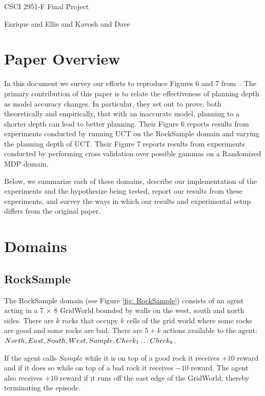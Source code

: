 \documentclass[11pt,twocolumn]{article}
\begin{document}
\centerline{\LARGE{CSCI 2951-F Final Project}}
\centerline{Enrique and Ellis and Kavosh and Dave}
\vspace{2mm}


\section{Paper Overview}

In this document we survey our efforts to reproduce Figures 6 and 7 from~\cite{jiang2015dependence}. The primary contribution of this paper is to relate the effectiveness of planning depth as model accuracy changes. In particular, they set out to prove, both theoretically and empirically, that with an inaccurate model, planning to a shorter depth can lead to better planning. Their Figure 6 reports results from experiments conducted by running UCT on the RockSample domain and varying the planning depth of UCT. Their Figure 7 reports results from experiments conducted by performing cross validation over possible gammas on a Randomized MDP domain.

Below, we summarize each of these domains, describe our implementation of the experiments and the hypothesize being tested, report our results from these experiments, and survey the ways in which our results and experimental setup differs from the original paper.

\section{Domains}

\subsection{RockSample}
\label{sec: rocksample}
The RockSample domain (see Figure \ref{fig: RockSample}) consists of an agent acting in a 7 $\times$ 8 GridWorld bounded by walls on the west, south and north sides. There are $k$ rocks that occupy $k$ cells of the grid world where some rocks are good and some rocks are bad. There are $5+k$ actions available to the agent: $North, East, South, West, Sample, \\
Check_1 \ldots Check_k$.

If the agent calls $Sample$ while it is on top of a good rock it receives $+10$ reward and if it does so while on top of a bad rock it receives $-10$ reward. The agent also receives $+10$ reward if it runs off the east edge of the GridWorld, thereby terminating the episode.
\end{document}
